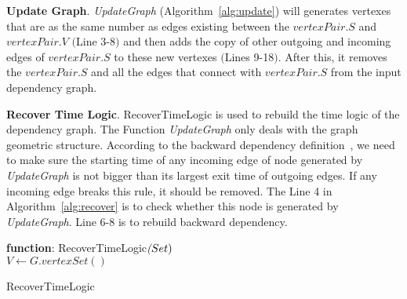 \textbf{Update Graph}.
\emph{UpdateGraph} (Algorithm~\ref{alg:update}) will generates vertexes that are as the same number as edges existing between the $vertexPair.S$ and $vertexPair.V$ $($Line 3-8$)$ and then adds the copy of other outgoing and incoming edges of $vertexPair.S$ to these new vertexes $($Lines 9-18$)$. After this, it removes the $vertexPair.S$ and all the edges that connect with $vertexPair.S$ from the input dependency graph.

\textbf{Recover Time Logic}.
 RecoverTimeLogic is used to rebuild the time logic of the dependency graph. The Function \textit{UpdateGraph} only deals with the graph geometric structure. According to the backward dependency definition~\cite{backtracking,backtrackingfile,backtracking2}, we need to make sure the starting time of any incoming edge of node generated by \textit{UpdateGraph} is not bigger than its largest exit time of outgoing edges. If any incoming edge breaks this rule, it should be removed. The Line 4 in Algorithm~\ref{alg:recover} is to check whether this node is generated by \textit{UpdateGraph}. Line 6-8 is to rebuild backward dependency.  

\begin{algorithm}[b]

	\textbf{function}: RecoverTimeLogic$\textit(Set)$\\
	$V \leftarrow G.vertexSet()$\;
	\caption{RecoverTimeLogic}
	\label{alg:recover} 	
\end{algorithm}

